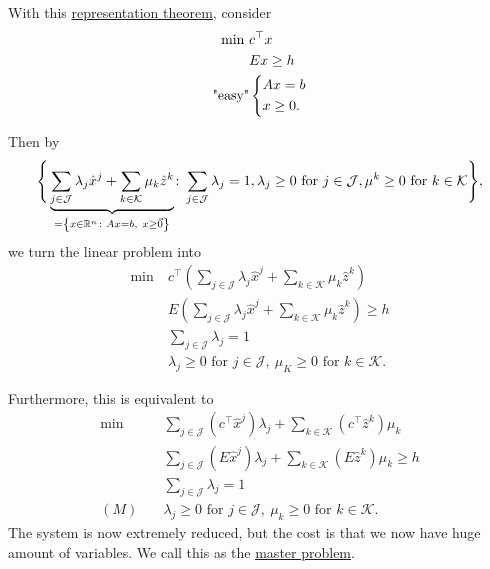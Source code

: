With this \hyperref[thm:representation-theorem]{representation theorem}, consider
\[
	\begin{aligned}
		\min~         & c^{\top}x     \\
		              & Ex\geq h      \\
		\text{"easy"} & \begin{dcases}
			                Ax = b \\
			                x\geq 0.
		                \end{dcases}
	\end{aligned}
\]

Then by
\[
	\Bigg\{\underbrace{\sum\limits_{j\in\mathcal{J}} \lambda_{j} \hat{x}^j + \sum\limits_{k\in\mathcal{K}}\mu_k \hat{z}^k}_{=\left\{x\in\mathbb{\MakeUppercase{R}}^n\colon Ax = b,\ x\geq \vec{0}\right\}}
	\colon \sum\limits_{j\in\mathcal{J}}\lambda_{j} = 1, \lambda_{j}\geq 0 \text{ for }j\in \mathcal{J}, \mu^k\geq 0\text{ for } k\in \mathcal{K}\Bigg\},
\]
we turn the linear problem into
\[
	\begin{aligned}
		\min~ & c^{\top}\left(\sum\limits_{j\in\mathcal{J}}\lambda_{j}\hat{x}^j + \sum\limits_{k\in\mathcal{K}}\mu_k \hat{z}^k  \right) \\
		      & E\left(\sum\limits_{j\in\mathcal{J}}\lambda_{j}\hat{x}^j + \sum\limits_{k\in\mathcal{K}}\mu_k \hat{z}^k  \right) \geq h \\
		      & \sum\limits_{j\in\mathcal{J}}\lambda_{j} = 1                                                                            \\
		      & \lambda_{j}\geq 0 \text{ for }j\in\mathcal{J},\ \mu_K\geq 0 \text{ for }k\in\mathcal{K}.
	\end{aligned}
\]

Furthermore, this is equivalent to
\[
	\begin{aligned}
		\min~    & \sum\limits_{j\in\mathcal{J}}\left(c^{\top}\hat{x}^j\right)\lambda_{j} + \sum\limits_{k\in\mathcal{K}}\left(c^{\top} \hat{z}^k  \right)\mu_k \\
		         & \sum\limits_{j\in\mathcal{J}}\left(E\hat{x}^j\right)\lambda_{j} + \sum\limits_{k\in\mathcal{K}}\left(E \hat{z}^k \right)\mu_k \geq h         \\
		         & \sum\limits_{j\in\mathcal{J}}\lambda_{j} = 1                                                                                                 \\
		(M)\quad & \lambda_{j}\geq 0 \text{ for }j\in\mathcal{J},\ \mu_k\geq 0 \text{ for }k\in\mathcal{K}.
	\end{aligned}
\]
The system is now extremely reduced, but the cost is that we now have huge amount of variables. We call this as the \hyperref[def:master-problem]{master problem}.


